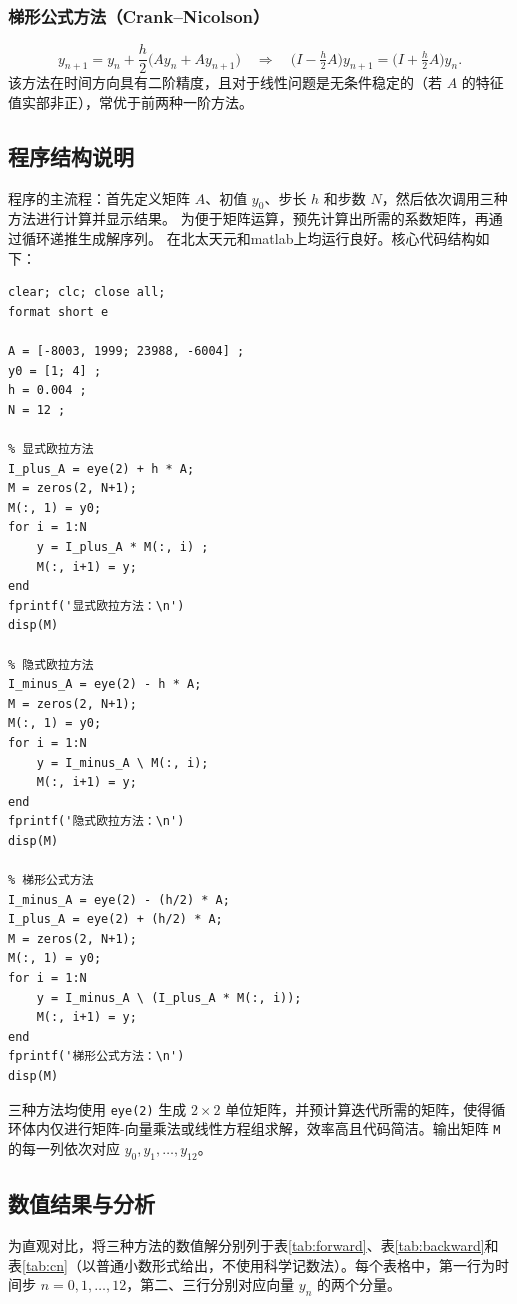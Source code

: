 \documentclass[12pt,a4paper]{article}
\begin{document}
\subsubsection{梯形公式方法（Crank–Nicolson）}
\[
y_{n+1} = y_n + \frac{h}{2} \bigl(A y_n + A y_{n+1}\bigr) \quad \Longrightarrow \quad \bigl(I - \tfrac{h}{2}A\bigr) y_{n+1} = \bigl(I + \tfrac{h}{2}A\bigr) y_n.
\]
该方法在时间方向具有二阶精度，且对于线性问题是无条件稳定的（若 \(A\) 的特征值实部非正），常优于前两种一阶方法。

\subsection{程序结构说明}

程序的主流程：首先定义矩阵 \(A\)、初值 \(y_0\)、步长 \(h\) 和步数 \(N\)，然后依次调用三种方法进行计算并显示结果。
为便于矩阵运算，预先计算出所需的系数矩阵，再通过循环递推生成解序列。
在北太天元和matlab上均运行良好。核心代码结构如下：

\begin{lstlisting}[caption={主程序框架}, label={lst:hw9main}]
clear; clc; close all;
format short e

A = [-8003, 1999; 23988, -6004] ;
y0 = [1; 4] ;
h = 0.004 ;
N = 12 ;

% 显式欧拉方法
I_plus_A = eye(2) + h * A;
M = zeros(2, N+1);
M(:, 1) = y0;
for i = 1:N
    y = I_plus_A * M(:, i) ;
    M(:, i+1) = y;
end
fprintf('显式欧拉方法：\n')
disp(M)

% 隐式欧拉方法
I_minus_A = eye(2) - h * A;
M = zeros(2, N+1);
M(:, 1) = y0;
for i = 1:N
    y = I_minus_A \ M(:, i);
    M(:, i+1) = y;
end
fprintf('隐式欧拉方法：\n')
disp(M)

% 梯形公式方法
I_minus_A = eye(2) - (h/2) * A;
I_plus_A = eye(2) + (h/2) * A;
M = zeros(2, N+1);
M(:, 1) = y0;
for i = 1:N
    y = I_minus_A \ (I_plus_A * M(:, i));
    M(:, i+1) = y;
end
fprintf('梯形公式方法：\n')
disp(M)
\end{lstlisting}

三种方法均使用 \texttt{eye(2)} 生成 \(2\times2\) 单位矩阵，并预计算迭代所需的矩阵，使得循环体内仅进行矩阵-向量乘法或线性方程组求解，效率高且代码简洁。输出矩阵 \texttt{M} 的每一列依次对应 \(y_0, y_1, \dots, y_{12}\)。

\subsection{数值结果与分析}

为直观对比，将三种方法的数值解分别列于表\ref{tab:forward}、表\ref{tab:backward}和表\ref{tab:cn}（以普通小数形式给出，不使用科学记数法）。每个表格中，第一行为时间步 \(n = 0,1,\dots,12\)，第二、三行分别对应向量 \(y_n\) 的两个分量。
\end{document}
